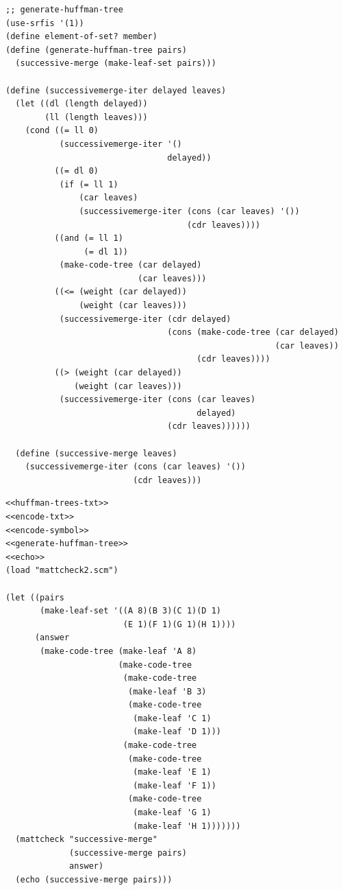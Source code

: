 \documentclass[final,fleqn,titlepage,twoside]{article}
\begin{document}
\begin{verbatim}
;; generate-huffman-tree
(use-srfis '(1))
(define element-of-set? member)
(define (generate-huffman-tree pairs)
  (successive-merge (make-leaf-set pairs)))

(define (successivemerge-iter delayed leaves)
  (let ((dl (length delayed))
        (ll (length leaves)))
    (cond ((= ll 0)
           (successivemerge-iter '()
                                 delayed))
          ((= dl 0)
           (if (= ll 1)
               (car leaves)
               (successivemerge-iter (cons (car leaves) '())
                                     (cdr leaves))))
          ((and (= ll 1)
                (= dl 1))
           (make-code-tree (car delayed)
                           (car leaves)))
          ((<= (weight (car delayed))
               (weight (car leaves)))
           (successivemerge-iter (cdr delayed)
                                 (cons (make-code-tree (car delayed)
                                                       (car leaves))
                                       (cdr leaves))))
          ((> (weight (car delayed))
              (weight (car leaves)))
           (successivemerge-iter (cons (car leaves)
                                       delayed)
                                 (cdr leaves))))))

  (define (successive-merge leaves)
    (successivemerge-iter (cons (car leaves) '())
                          (cdr leaves)))
\end{verbatim}

\begin{verbatim}
<<huffman-trees-txt>>
<<encode-txt>>
<<encode-symbol>>
<<generate-huffman-tree>>
<<echo>>
(load "mattcheck2.scm")

(let ((pairs
       (make-leaf-set '((A 8)(B 3)(C 1)(D 1)
                        (E 1)(F 1)(G 1)(H 1))))
      (answer
       (make-code-tree (make-leaf 'A 8)
                       (make-code-tree
                        (make-code-tree
                         (make-leaf 'B 3)
                         (make-code-tree
                          (make-leaf 'C 1)
                          (make-leaf 'D 1)))
                        (make-code-tree
                         (make-code-tree
                          (make-leaf 'E 1)
                          (make-leaf 'F 1))
                         (make-code-tree
                          (make-leaf 'G 1)
                          (make-leaf 'H 1)))))))
  (mattcheck "successive-merge"
             (successive-merge pairs)
             answer)
  (echo (successive-merge pairs)))
\end{verbatim}
\end{document}
